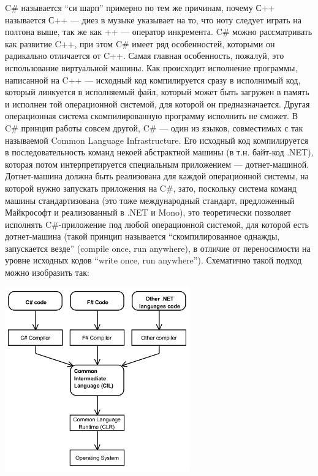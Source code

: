 \documentclass[a5paper]{article}
\begin{document}
C\# называется ``си шарп'' примерно по тем же причинам, почему С++ называется С++ --- диез в музыке указывает на то, что ноту следует играть на полтона выше, так же как ++ --- оператор инкремента. C\# можно рассматривать как развитие C++, при этом C\# имеет ряд особенностей, которыми он радикально отличается от C++. Самая главная особенность, пожалуй, это использование виртуальной машины. Как происходит исполнение программы, написанной на C++ --- исходный код компилируется сразу в исполнимый код, который линкуется в исполняемый файл, который может быть загружен в память и исполнен той операционной системой, для которой он предназначается. Другая операционная система скомпилированную программу исполнить не сможет. В C\# принцип работы совсем другой, C\# --- один из языков, совместимых с так называемой Common Language Infrastructure. Его исходный код компилируется в последовательность команд некоей абстрактной машины (в т.н. байт-код .NET), которая потом интерпретируется специальным приложением --- дотнет-машиной. Дотнет-машина должна быть реализована для каждой операционной системы, на которой нужно запускать приложения на C\#, зато, поскольку система команд машины стандартизована (это тоже международный стандарт, предложенный Майкрософт и реализованный в .NET и Mono), это теоретически позволяет исполнять C\#-приложение под любой операционной системой, для которой есть дотнет-машина (такой принцип называется ``скомпилированное однажды, запускается везде'' (compile once, run anywhere), в отличие от переносимости на уровне исходных кодов ``write once, run anywhere''). Схематично такой подход можно изобразить так:

\begin{center}
	\includegraphics[width=0.6\textwidth]{cli.png}
\end{center}
\end{document}
